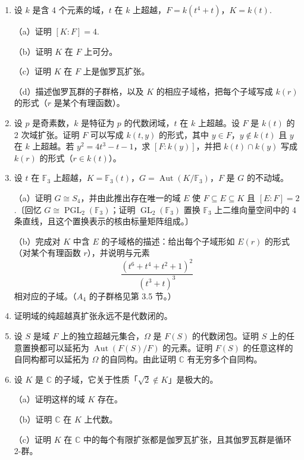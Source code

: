 \begin{enumerate}
\item 设 \(k\) 是含 4 个元素的域，\(t\) 在 \(k\) 上超越，\(F = k(t^4+t)\)，\(K = k(t)\).

（a）证明 \([K:F] = 4\).

（b）证明 \(K\) 在 \(F\) 上可分。

（c）证明 \(K\) 在 \(F\) 上是伽罗瓦扩张。

（d）描述伽罗瓦群的子群格，以及 \(K\) 的相应子域格，把每个子域写成 \(k(r)\) 的形式（\(r\) 是某个有理函数）。

\item 设 \(p\) 是奇素数，\(k\) 是特征为 \(p\) 的代数闭域，\(t\) 在 \(k\) 上超越。设 \(F\) 是 \(k(t)\) 的 2 次域扩张。证明 \(F\) 可以写成 \(k(t, y)\) 的形式，其中 \(y \in F\)，\(y \notin k(t)\) 且 \(y\) 在 \(k\) 上超越。若 \(y^2 = 4t^3-t-1\)，求 \([F:k(y)]\)，并把 \(k(t) \cap k(y)\) 写成 \(k(r)\) 的形式（\(r \in k(t)\)）。

\item 设 \(t\) 在 \(\mathbb{F}_3\) 上超越，\(K = \mathbb{F}_3(t)\)，\(G = \operatorname{Aut}(K/\mathbb{F}_3)\)，\(F\) 是 \(G\) 的不动域。

（a）证明 \(G \cong S_4\)，并由此推出存在唯一的域 \(E\) 使 \(F \subseteq E \subseteq K\) 且 \([E:F] = 2\).〔回忆 \(G \cong \operatorname{PGL}_2(\mathbb{F}_3)\)；证明 \(\operatorname{GL}_2(\mathbb{F}_3)\) 置换 \(\mathbb{F}_3\) 上二维向量空间中的 4 条直线，且这个置换表示的核由标量矩阵组成。〕

（b）完成对 \(K\) 中含 \(E\) 的子域格的描述：给出每个子域形如 \(E(r)\) 的形式（对某个有理函数 \(r\)），并说明与元素
\[
\frac{(t^6+t^4+t^2+1)^2}{(t^3+t)^3}
\]
相对应的子域。（\(A_4\) 的子群格见第 3.5 节。）

\item 证明域的纯超越真扩张永远不是代数闭的。

\item 设 \(S\) 是域 \(F\) 上的独立超越元集合，\(\Omega\) 是 \(F(S)\) 的代数闭包。证明 \(S\) 上的任意置换都可以延拓为 \(\operatorname{Aut}(F(S)/F)\) 的元素。证明 \(F(S)\) 的任意这样的自同构都可以延拓为 \(\Omega\) 的自同构。由此证明 \(\mathbb{C}\) 有无穷多个自同构。

\item 设 \(K\) 是 \(\mathbb{C}\) 的子域，它关于性质「\(\sqrt{2} \notin K\)」是极大的。

（a）证明这样的域 \(K\) 存在。

（b）证明 \(\mathbb{C}\) 在 \(K\) 上代数。

（c）证明 \(K\) 在 \(\mathbb{C}\) 中的每个有限扩张都是伽罗瓦扩张，且其伽罗瓦群是循环 2-群。


\end{enumerate}
